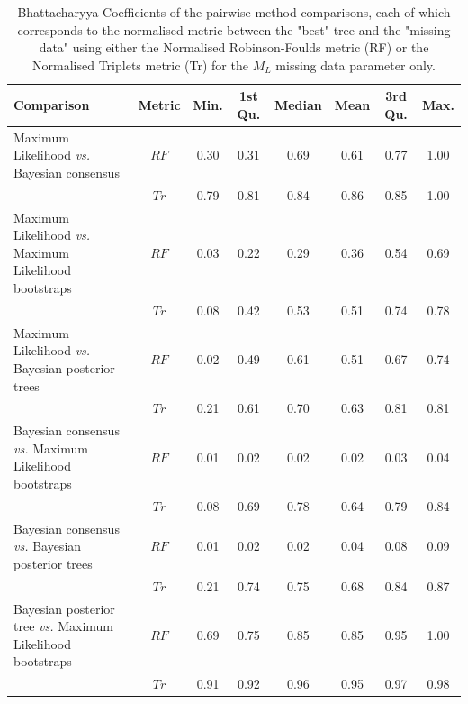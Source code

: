 \documentclass[12pt,letterpaper]{article}
\begin{document}
\begin{landscape}
\begin{table}[ht]
\caption{Bhattacharyya Coefficients of the pairwise method comparisons, each of which corresponds to the normalised metric between the "best" tree and the "missing data" using either the Normalised Robinson-Foulds metric (RF) or the Normalised Triplets metric (Tr) for the $M_{L}$ missing data parameter only.}
\label{Tab_Supp_summary_BC_ML}
\centering
\begin{tabular}{lccccccc}
  \hline
 Comparison &  Metric & Min. & 1st Qu. & Median & Mean & 3rd Qu. & Max. \\ 
  \hline
    Maximum Likelihood \textit{vs.} Bayesian consensus                 & $RF$ & 0.30 & 0.31 & 0.69 & 0.61 & 0.77 & 1.00 \\ 
                                                                       & $Tr$ & 0.79 & 0.81 & 0.84 & 0.86 & 0.85 & 1.00 \\ 
    Maximum Likelihood \textit{vs.} Maximum Likelihood bootstraps      & $RF$ & 0.03 & 0.22 & 0.29 & 0.36 & 0.54 & 0.69 \\ 
                                                                       & $Tr$ & 0.08 & 0.42 & 0.53 & 0.51 & 0.74 & 0.78 \\ 
    Maximum Likelihood \textit{vs.} Bayesian posterior trees           & $RF$ & 0.02 & 0.49 & 0.61 & 0.51 & 0.67 & 0.74 \\ 
                                                                       & $Tr$ & 0.21 & 0.61 & 0.70 & 0.63 & 0.81 & 0.81 \\ 
    Bayesian consensus \textit{vs.} Maximum Likelihood bootstraps      & $RF$ & 0.01 & 0.02 & 0.02 & 0.02 & 0.03 & 0.04 \\ 
                                                                       & $Tr$ & 0.08 & 0.69 & 0.78 & 0.64 & 0.79 & 0.84 \\ 
    Bayesian consensus \textit{vs.} Bayesian posterior trees           & $RF$ & 0.01 & 0.02 & 0.02 & 0.04 & 0.08 & 0.09 \\ 
                                                                       & $Tr$ & 0.21 & 0.74 & 0.75 & 0.68 & 0.84 & 0.87 \\ 
    Bayesian posterior tree \textit{vs.} Maximum Likelihood bootstraps & $RF$ & 0.69 & 0.75 & 0.85 & 0.85 & 0.95 & 1.00 \\ 
                                                                       & $Tr$ & 0.91 & 0.92 & 0.96 & 0.95 & 0.97 & 0.98 \\ 
   \hline
\end{tabular}
\end{table}
\end{landscape}
\end{document}
